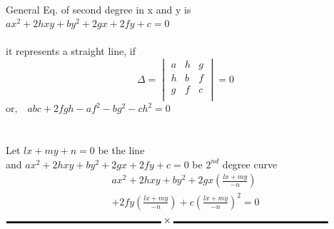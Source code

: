 \documentclass[11pt,a4paper,landscape]{article}
\begin{document}
\pagebreak
%
%
%
%
%
\begin{multicols*}{3}
{\bfseries {}}\\
General Eq. of second degree in x and y is\\
$ax^2+2hxy+by^2+2gx+2fy+c=0$\\ \\
it represents a straight line, if\\
$$
	\Delta = 
	\begin{vmatrix}
		a & h & g\\
		h & b & f\\
		g & f & c\\
	\end{vmatrix}
	=0
$$
$
\textrm{or,} \quad abc+2fgh-af^2 -bg^2 - ch^2 = 0
$\\ \\
%
%
%

{\bfseries {}}\\
Let $lx+my+n =0$ be the line \\
and $ax^2 + 2hxy+by^2+2gx+2fy+c=0$ be $2^{nd}$ degree curve
\begin{multline*}
ax^2+2hxy+by^2+2gx\left(\frac{lx+my}{-n}\right) \\
+2fy\left(\frac{lx+my}{-n}\right)+c\left({\frac{lx+my}{-n}}\right)^2 =0
\end{multline*}
$\rule{0.45\linewidth}{2pt} \times \rule{0.45\linewidth}{2pt}$\\

\end{multicols*}
\end{document}
